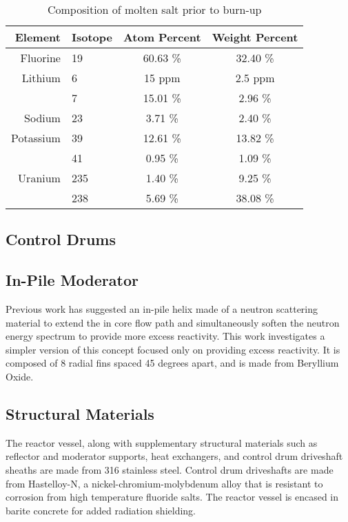 \begin{table}[!ht]
    \caption[Molten salt composition]{Composition of molten salt prior to burn-up}
    \centering
    \begin{tabular}{rl|cc}
     Element&Isotope&Atom Percent & Weight Percent \\ \hline
     Fluorine  & 19  & 60.63 \%  & 32.40 \% \\  \hline
     Lithium   & 6   & 15 ppm    & 2.5 ppm  \\
               & 7   & 15.01 \%  & 2.96 \%  \\ \hline
     Sodium    & 23  &  3.71 \%  & 2.40 \%  \\ \hline
     Potassium & 39  & 12.61 \%  & 13.82 \% \\
               & 41  & 0.95 \%  & 1.09 \%  \\ \hline
    Uranium    & 235 & 1.40 \%   & 9.25 \%  \\
               & 238 & 5.69 \%   & 38.08 \% \\
    \end{tabular}
    \label{tab:saltcomp}
\end{table}

\subsection{Control Drums}


\subsection{In-Pile Moderator}
Previous work \cite{CarterPHD} has suggested an in-pile helix made of a neutron scattering material to extend the in core flow path and simultaneously soften the neutron energy spectrum to provide more excess reactivity. This work investigates a simpler version of this concept focused only on providing excess reactivity. It is composed of 8 radial fins spaced 45 degrees apart, and is made from Beryllium Oxide.

\subsection{Structural Materials}
The reactor vessel, along with supplementary structural materials such as reflector and moderator supports, heat exchangers, and control drum driveshaft sheaths are made from 316 stainless steel. Control drum driveshafts are made from Hastelloy-N, a nickel-chromium-molybdenum alloy that is resistant to corrosion from high temperature fluoride salts. The reactor vessel is encased in barite concrete for added radiation shielding.

